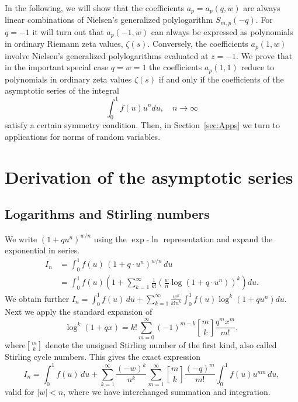 \documentclass[10pt,reqno,a4paper]{amsart}%
\theoremstyle{definition}
\newcommand{\stir}[2]{\genfrac{ [ }{ ] }{0pt}{}{#1}{#2}}
\begin{document}
\smallskip

In the following, we will show that the coefficients $a_{p}=a_{p}(q,w)$ are
always linear combinations of Nielsen's generalized polylogarithm
$S_{m,p}(-q)$. For $q=-1$ it will turn out that $a_{p}(-1,w)$ can always be
expressed as polynomials in ordinary Riemann zeta values, $\zeta(s)$.
Conversely, the coefficients $a_{p}(1,w)$ involve Nielsen's generalized
polylogarithms evaluated at $z=-1$. We prove that in the important special
case $q=w=1$ the coefficients $a_{p}(1,1)$ reduce to polynomials in ordinary
zeta values $\zeta(s)$ if and only if the coefficients of the asymptotic
series of the integral
\[
\int_{0}^{1}f(u)u^{n}du,\quad n\rightarrow\infty
\]
satisfy a certain symmetry condition. Then, in Section~\ref{sec:Apps} we turn
to applications for norms of random variables.

\section{Derivation of the asymptotic series}

\subsection{Logarithms and Stirling numbers}

We write $(1+qu^{n})^{w/n}$ using the $\exp$-$\ln$ representation and expand
the exponential in series.
\begin{align*}
I_{n}  &  =\int_{0}^{1}f(u)\,(1+q\cdot u^{n})^{w/n}\,du\\
&  =\int_{0}^{1}f(u)\left(  1+\sum_{k=1}^{\infty}\frac{1}{k!}\left(  \frac
{w}{n}\log(1+q\cdot u^{n})\right)  ^{k}\right)  du.
\end{align*}
We obtain further $I_{n}=\int_{0}^{1}f(u)\,du+\sum_{k=1}^{\infty}\frac{w^{k}%
}{k!n^{k}}\int_{0}^{1}f(u)\log^{k}(1+qu^{n})du.$ Next we apply the standard
expansion of
\begin{equation}
\log^{k}(1+qx)=k!\sum_{m=0}^{\infty}(-1)^{m-k}%
\genfrac{[}{]}{0pt}{}{m}{k}%
\frac{q^{m}x^{m}}{m!}, \label{eq:ExpanLog}%
\end{equation}
where$%
\genfrac{[}{]}{0pt}{}{m}{k}%
$ denote the unsigned Stirling number of the first kind, also called Stirling
cycle numbers. This gives the exact expression
\[
I_{n}=\int_{0}^{1}f(u)\,du+\sum_{k=1}^{\infty}\frac{(-w)^{k}}{n^{k}}%
\sum_{m=1}^{\infty}%
\genfrac{[}{]}{0pt}{}{m}{k}%
\frac{(-q)^{m}}{m!}\int_{0}^{1}f(u)u^{nm}\,du,
\]
valid for $|w|<n$, where we have interchanged summation and integration.
\end{document}

